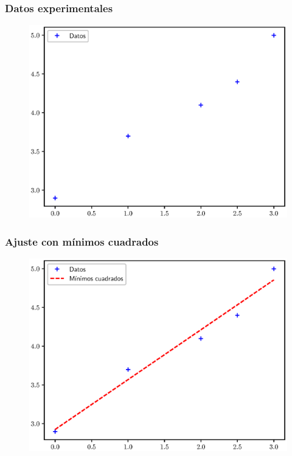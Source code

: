 \documentclass[12pt]{beamer}
\begin{document}
\begin{frame}[fragile]
\frametitle{Datos experimentales}
\vspace*{-0.25cm}
\begin{figure}
    \centering
    \includegraphics[scale=0.6]{Imagenes/Intro_Interpolacion_001.eps}
\end{figure}
\end{frame}
\begin{frame}[fragile]
\frametitle{Ajuste con mínimos cuadrados}
\vspace*{-0.25cm}
\begin{figure}
    \centering
    \includegraphics[scale=0.6]{Imagenes/Intro_Interpolacion_002.eps}
\end{figure}
\end{frame}
\end{document}
